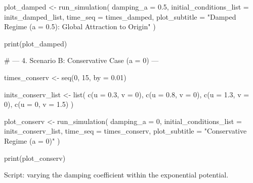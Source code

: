 \documentclass[12pt]{amsart}
\numberwithin{equation}{section}
\begin{document}
\begin{rcode}
plot_damped <- run_simulation(
damping_a = 0.5, 
initial_conditions_list = inits_damped_list, 
time_seq = times_damped, 
plot_subtitle = "Damped Regime (a = 0.5): Global Attraction to Origin"
)

print(plot_damped)

# --- 4. Scenario B: Conservative Case (a = 0) ---

times_conserv <- seq(0, 15, by = 0.01)

inits_conserv_list <- list(
c(u = 0.3, v = 0),
c(u = 0.8, v = 0),
c(u = 1.3, v = 0),
c(u = 0,   v = 1.5)
)

plot_conserv <- run_simulation(
damping_a = 0, 
initial_conditions_list = inits_conserv_list, 
time_seq = times_conserv, 
plot_subtitle = "Conservative Regime (a = 0)"
)

print(plot_conserv)
\end{rcode}



\medskip

\noindent Script: varying the damping coefficient within the exponential potential. 

\medskip
\end{document}
